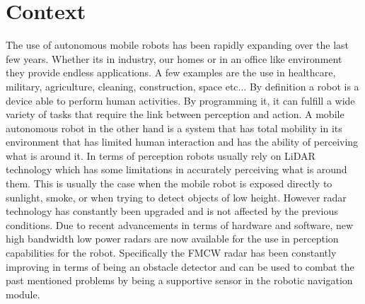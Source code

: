 \section{Context}
The use of autonomous mobile robots has been rapidly expanding over the last few years. Whether its in industry, our homes or in an office like environment they provide endless applications. A few examples are the use in healthcare, military, agriculture, cleaning, construction, space etc...
By definition a robot is a device able to perform human activities.  By programming it, it can fulfill a wide variety of tasks that require the link between perception and  action. A mobile autonomous robot in the other hand is a system that has total mobility in its environment that has limited human interaction and has the ability of perceiving what is around it. In terms of perception robots usually rely on \ac{LiDAR} technology which has some limitations in accurately perceiving what is around them. This is usually the case when the mobile robot is exposed directly to sunlight, smoke, or when trying to detect objects of low height. However \ac{radar} technology has constantly  been  upgraded and is not affected by the previous conditions. Due to recent advancements in terms of hardware and software, new high bandwidth low power radars are now available for the use in perception capabilities for the robot.   
Specifically the \ac{FMCW} \ac{radar} has been constantly improving in terms of being an obstacle detector and  can be used to combat the past mentioned problems by being a supportive sensor in the robotic navigation module.




